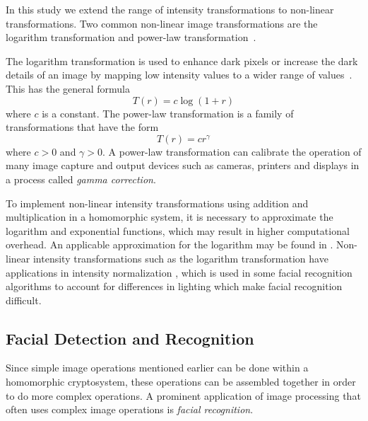In this study we extend the range of intensity transformations to non-linear transformations. Two common non-linear image transformations are the logarithm transformation and power-law transformation~\cite{gonzalez_digital_2008}.

The logarithm transformation is used to enhance dark pixels or increase the dark details of an image by mapping low intensity values to a wider range of values~\cite{gonzalez_digital_2008}. This has the general formula
\begin{equation}
    T\left(r\right) = c \log\left(1 + r\right)
\end{equation}
where $c$ is a constant.
The power-law transformation is a family of transformations that have the form
\begin{equation}
    T\left(r\right) = c r^{\gamma}
\end{equation}
where $c>0$ and $\gamma > 0$.
A power-law transformation can calibrate the operation of many image capture and output devices such as cameras, printers and displays in a process called \textit{gamma correction}.

To implement non-linear intensity transformations using addition and multiplication in a homomorphic system, it is necessary to approximate the logarithm and exponential functions, which may result in higher computational overhead. An applicable approximation for the logarithm may be found in \cite{pcsc-paper}. 
Non-linear intensity transformations such as the logarithm transformation have applications in intensity normalization \cite{oravec_illumination_2010}, which is used in some facial recognition algorithms to account for differences in lighting which make facial recognition difficult.

\subsection{Facial Detection and Recognition}

Since simple image operations mentioned earlier can be done within a homomorphic cryptosystem, these operations can be assembled together in order to do more complex operations. A prominent application of image processing that often uses complex image operations is \textit{facial recognition}.

